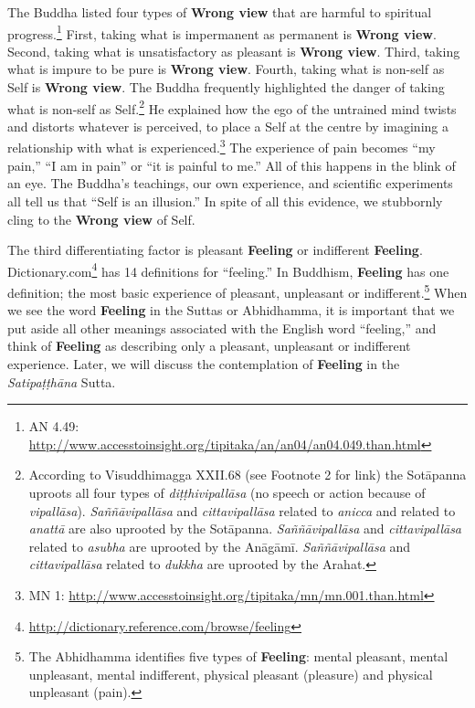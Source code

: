 The Buddha listed four types of \textbf{Wrong view} that are harmful to spiritual progress.\footnote{AN 4.49: \url{http://www.accesstoinsight.org/tipitaka/an/an04/an04.049.than.html}} First, taking what is impermanent as permanent is \textbf{Wrong view}. Second, taking what is unsatisfactory as pleasant is \textbf{Wrong view}. Third, taking what is impure to be pure is \textbf{Wrong view}. Fourth, taking what is non-self as Self is \textbf{Wrong view}. The Buddha frequently highlighted the danger of taking what is non-self as Self.\footnote{According to Visuddhimagga XXII.68 (see Footnote 2 for link) the Sotāpanna uproots all four types of \textit{diṭṭhivipallāsa} (no speech or action because of \textit{vipallāsa}). \textit{Saññāvipallāsa} and \textit{cittavipallāsa} related to \textit{anicca} and related to \textit{anattā} are also uprooted by the Sotāpanna. \textit{Saññāvipallāsa} and \textit{cittavipallāsa} related to \textit{asubha} are uprooted by the Anāgāmī. \textit{Saññāvipallāsa} and \textit{cittavipallāsa} related to \textit{dukkha} are uprooted by the Arahat.} He explained how the ego of the untrained mind twists and distorts whatever is perceived, to place a Self at the centre by imagining a relationship with what is experienced.\footnote{MN 1: \url{http://www.accesstoinsight.org/tipitaka/mn/mn.001.than.html}} The experience of pain becomes “my pain,” “I am in pain” or “it is painful to me.” All of this happens in the blink of an eye. The Buddha’s teachings, our own experience, and scientific experiments all tell us that “Self is an illusion.” In spite of all this evidence, we stubbornly cling to the \textbf{Wrong view} of Self.

The third differentiating factor is pleasant \textbf{Feeling} or indifferent \textbf{Feeling}. Dictionary.com\footnote{\url{http://dictionary.reference.com/browse/feeling}} has 14 definitions for “feeling.” In Buddhism, \textbf{Feeling} has one definition; the most basic experience of pleasant, unpleasant or indifferent.\footnote{The Abhidhamma identifies five types of \textbf{Feeling}: mental pleasant, mental unpleasant, mental indifferent, physical pleasant (pleasure) and physical unpleasant (pain).} When we see the word \textbf{Feeling} in the Suttas or Abhidhamma, it is important that we put aside all other meanings associated with the English word “feeling,” and think of \textbf{Feeling} as describing only a pleasant, unpleasant or indifferent experience. Later, we will discuss the contemplation of \textbf{Feeling} in the \textit{Satipaṭṭhāna} Sutta.


